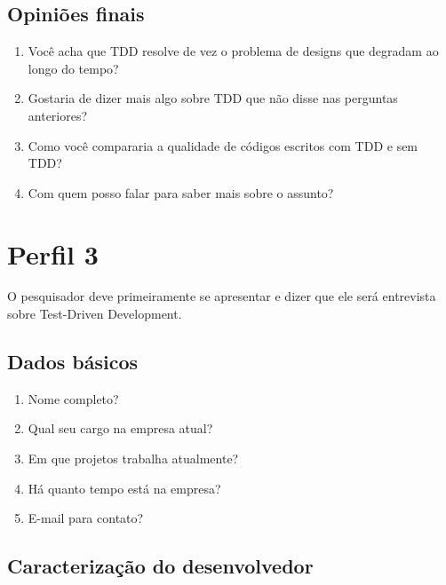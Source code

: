 \subsection{Opiniões finais}

\begin{enumerate}
	\item Você acha que TDD resolve de vez o problema de designs que degradam ao longo do tempo?

	\item Gostaria de dizer mais algo sobre TDD que não disse nas perguntas anteriores?
	
	\item Como você compararia a qualidade de códigos escritos com TDD e sem TDD? 

	\item Com quem posso falar para saber mais sobre o assunto?
\end{enumerate}


\section{Perfil 3}

O pesquisador deve primeiramente se apresentar e dizer que ele será entrevista
sobre Test-Driven Development.

\subsection{Dados básicos}
\label{entrevista:dados-basicos}

\begin{enumerate}
	\item Nome completo?

	\item Qual seu cargo na empresa atual?
	
	\item Em que projetos trabalha atualmente?
	
	\item Há quanto tempo está na empresa?

	\item E-mail para contato?

\end{enumerate}

\subsection{Caracterização do desenvolvedor}
\label{entrevista:caracterizacao}

